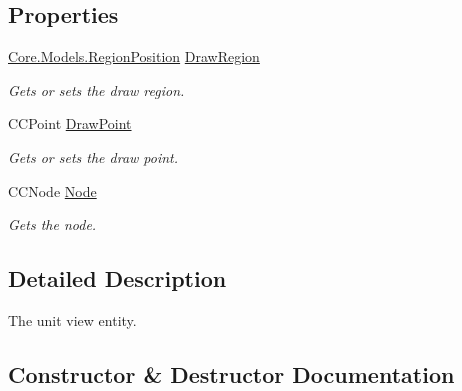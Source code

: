 \subsection*{Properties}
\begin{DoxyCompactItemize}
\item 
\hyperlink{classCore_1_1Models_1_1RegionPosition}{Core.\+Models.\+Region\+Position} \hyperlink{classClient_1_1Common_1_1Views_1_1UnitView_adb07067ac0b2545c045eda8b374c3eb1}{Draw\+Region}
\begin{DoxyCompactList}\small\item\em Gets or sets the draw region. \end{DoxyCompactList}\item 
C\+C\+Point \hyperlink{classClient_1_1Common_1_1Views_1_1UnitView_a51a86c09c3525d0699939436ab804062}{Draw\+Point}
\begin{DoxyCompactList}\small\item\em Gets or sets the draw point. \end{DoxyCompactList}\item 
C\+C\+Node \hyperlink{classClient_1_1Common_1_1Views_1_1UnitView_a1c4e67803cf25a3e1c6186a154249dea}{Node}
\begin{DoxyCompactList}\small\item\em Gets the node. \end{DoxyCompactList}\end{DoxyCompactItemize}


\subsection{Detailed Description}
The unit view entity. 



\subsection{Constructor \& Destructor Documentation}
\hypertarget{classClient_1_1Common_1_1Views_1_1UnitView_a6db43232d8801e7eeda8c97a52dd3df8}{}
